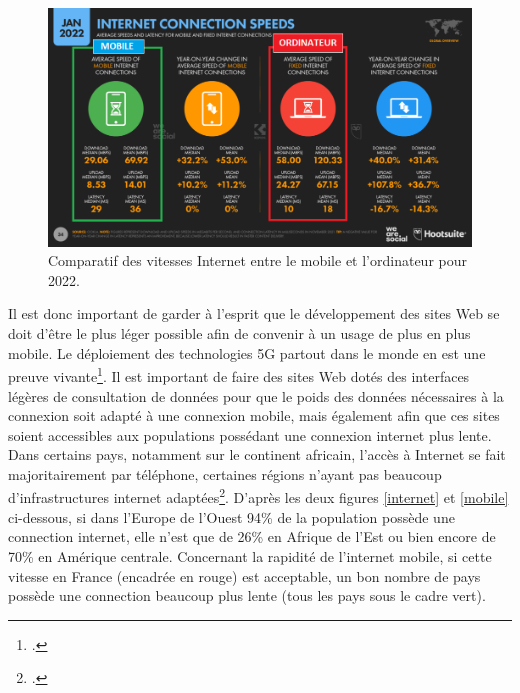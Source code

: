 \documentclass[a4paper,12pt,twoside]{book}
\begin{document}
\begin{figure}[H]
    \centering
    \includegraphics[width=\linewidth]{img/partie_3/speed.png}
    \caption[Comparatif des vitesses Internet entre le mobile et l'ordinateur pour 2022]{Comparatif des vitesses Internet entre le mobile et l'ordinateur pour 2022.\footnotemark}
    \label{speed}
\end{figure}


Il est donc important de garder à l'esprit que le développement des sites Web se doit d'être le plus léger possible afin de convenir à un usage de plus en plus mobile. Le déploiement des technologies 5G partout dans le monde en est une preuve vivante\footcite{cinqg}. Il est important de faire des sites Web dotés des interfaces légères de consultation de données pour que le poids des données nécessaires à la connexion soit adapté à une connexion mobile, mais également afin que ces sites soient accessibles aux populations possédant une connexion internet plus lente. Dans certains pays, notamment sur le continent africain, l'accès à Internet se fait majoritairement par téléphone, certaines régions n'ayant pas beaucoup d'infrastructures internet adaptées\footcite{africa}. D'après les deux figures \ref{internet} et \ref{mobile} ci-dessous, si dans l'Europe de l'Ouest 94\% de la population possède une connection internet, elle n'est que de 26\% en Afrique de l'Est ou bien encore de 70\% en Amérique centrale. Concernant la rapidité de l'internet mobile, si cette vitesse en France (encadrée en rouge) est acceptable, un bon nombre de pays possède une connection beaucoup plus lente (tous les pays sous le cadre vert).
\end{document}

